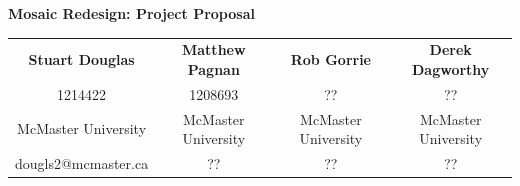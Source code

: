 \documentclass[10pt]{article}
\begin{document}
\begin{center}
{\LARGE \sffamily \textbf{Mosaic Redesign: Project Proposal} \vspace{2mm}}\\
\begin{tabular}{cccc}
\textbf{Stuart Douglas} & \textbf{Matthew Pagnan} & \textbf{Rob Gorrie} & \textbf{Derek Dagworthy}\\
1214422 & 1208693 & ?? & ??\\
McMaster University & McMaster University & McMaster University & McMaster University\\
dougls2@mcmaster.ca & ?? & ?? & ??\\
\end{tabular}
\end{center}
\vspace{2mm}
\end{document}
